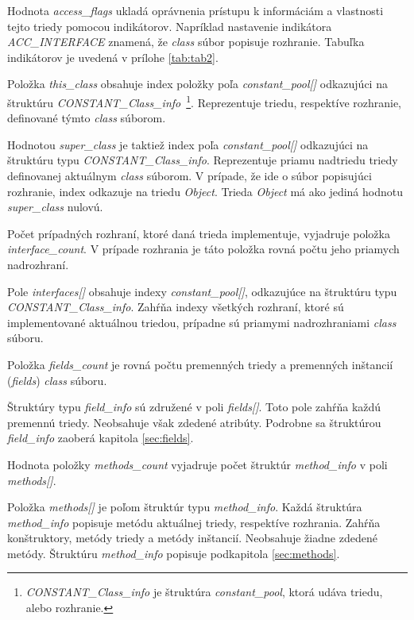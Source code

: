 \documentclass[11pt,final,oneside]{fithesis}
\begin{document}
Hodnota \textit{access\_flags} ukladá oprávnenia prístupu k
informáciám a vlastnosti tejto triedy pomocou
indikátorov. Napríklad nastavenie indikátora \textit{ACC\_INTERFACE} znamená,
že \textit{class} súbor popisuje rozhranie. Tabuľka indikátorov je uvedená v prílohe \ref{tab:tab2}.

Položka \textit{this\_class} obsahuje index položky poľa 
\textit{constant\_pool[]} odkazujúci na štruktúru
\textit{CONSTANT\_Class\_info}~\footnote{\textit{CONSTANT\_Class\_info} je 
štruktúra \textit{constant\_pool}, ktorá
udáva triedu, alebo rozhranie.}. Reprezentuje triedu, respektíve
rozhranie, definované týmto \textit{class} súborom.

Hodnotou \textit{super\_class} je taktiež index poľa \textit{constant\_pool[]}
odkazujúci na štruktúru typu \textit{CONSTANT\_Class\_info}. Reprezentuje
priamu nadtriedu triedy definovanej aktuálnym \textit{class} súborom. V 
prípade, že ide o súbor popisujúci rozhranie, index odkazuje na triedu
\textit{Object}. Trieda \textit{Object} má ako jediná hodnotu
\textit{super\_class} nulovú.

Počet prípadných rozhraní, ktoré daná trieda implementuje, vyjadruje položka
\textit{interface\_count}. V prípade rozhrania je táto položka rovná počtu
jeho priamych nadrozhraní.

Pole \textit{interfaces[]} obsahuje indexy \textit{constant\_pool[]},
odkazujúce na štruktúru typu \textit{CONSTANT\_Class\_info}. Zahŕňa indexy
všetkých rozhraní, ktoré sú implementované aktuálnou triedou, prípadne sú 
priamymi nadrozhraniami \textit{class} súboru.

Položka \textit{fields\_count} je rovná počtu premenných triedy a premenných
inštancií (\textit{fields}) \textit{class} súboru.

Štruktúry typu \textit{field\_info} sú združené v poli \textit{fields[]}. Toto
pole zahŕňa každú premennú triedy. Neobsahuje však zdedené atribúty. Podrobne 
sa štruktúrou \textit{field\_info} zaoberá kapitola \ref{sec:fields}.

Hodnota položky \textit{methods\_count} vyjadruje počet štruktúr
\textit{method\_info} v poli \textit{methods[]}.

Položka \textit{methods[]} je poľom štruktúr typu \textit{method\_info}. Každá
štruktúra \textit{method\_info} popisuje metódu aktuálnej triedy, respektíve
rozhrania. Zahŕňa konštruktory, metódy triedy a
metódy inštancií. Neobsahuje žiadne zdedené metódy. Štruktúru
\textit{method\_info} popisuje podkapitola \ref{sec:methods}.
\end{document}
